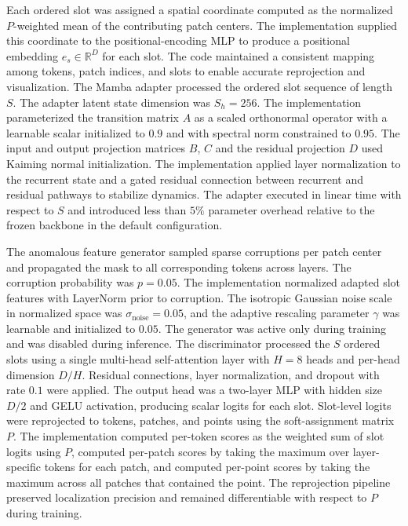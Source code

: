 Each ordered slot was assigned a spatial coordinate computed as the normalized \(P\)-weighted mean of the contributing patch centers. The implementation supplied this coordinate to the positional-encoding MLP to produce a positional embedding \(e_s\in\mathbb{R}^D\) for each slot. The code maintained a consistent mapping among tokens, patch indices, and slots to enable accurate reprojection and visualization. The Mamba adapter processed the ordered slot sequence of length \(S\). The adapter latent state dimension was \(S_h=256\). The implementation parameterized the transition matrix \(A\) as a scaled orthonormal operator with a learnable scalar initialized to \(0.9\) and with spectral norm constrained to \(0.95\). The input and output projection matrices \(B\), \(C\) and the residual projection \(D\) used Kaiming normal initialization. The implementation applied layer normalization to the recurrent state and a gated residual connection between recurrent and residual pathways to stabilize dynamics. The adapter executed in linear time with respect to \(S\) and introduced less than \(5\%\) parameter overhead relative to the frozen backbone in the default configuration.

The anomalous feature generator sampled sparse corruptions per patch center and propagated the mask to all corresponding tokens across layers. The corruption probability was \(p=0.05\). The implementation normalized adapted slot features with LayerNorm prior to corruption. The isotropic Gaussian noise scale in normalized space was \(\sigma_{\mathrm{noise}}=0.05\), and the adaptive rescaling parameter \(\gamma\) was learnable and initialized to \(0.05\). The generator was active only during training and was disabled during inference. The discriminator processed the \(S\) ordered slots using a single multi-head self-attention layer with \(H=8\) heads and per-head dimension \(D/H\). Residual connections, layer normalization, and dropout with rate \(0.1\) were applied. The output head was a two-layer MLP with hidden size \(D/2\) and GELU activation, producing scalar logits for each slot. Slot-level logits were reprojected to tokens, patches, and points using the soft-assignment matrix \(P\). The implementation computed per-token scores as the weighted sum of slot logits using \(P\), computed per-patch scores by taking the maximum over layer-specific tokens for each patch, and computed per-point scores by taking the maximum across all patches that contained the point. The reprojection pipeline preserved localization precision and remained differentiable with respect to \(P\) during training.

